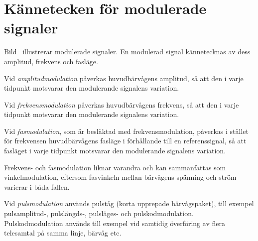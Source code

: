 \section{Kännetecken för modulerade signaler}
\label{kännetecken_modulerade_signaler}


Bild~ illustrerar modulerade signaler.
En modulerad signal kännetecknas av dess amplitud, frekvens och fasläge.

Vid \emph{amplitudmodulation} påverkas huvudbärvågens amplitud, så att den i
varje tidpunkt motsvarar den modulerande signalens variation.

Vid \emph{frekvensmodulation} påverkas huvudbärvågens frekvens, så att den i
varje tidpunkt motsvarar den modulerande signalens variation.

Vid \emph{fasmodulation}, som är besläktad med frekvensmodulation, påverkas i
stället för frekvensen huvudbärvågens fasläge i förhållande till en
referenssignal, så att fasläget i varje tidpunkt motsvarar den modulerande
signalens variation.

Frekvens- och fasmodulation liknar varandra och kan sammanfattas som
vinkelmodulation, eftersom fasvinkeln mellan bärvågens spänning och ström
varierar i båda fallen.

Vid \emph{pulsmodulation} används pulståg (korta upprepade bärvågspaket), till
exempel pulsamplitud-, pulslängds-, pulsläges- och pulskodmodulation.
Pulskodmodulation används till exempel vid samtidig överföring av flera
telesamtal på samma linje, bärvåg etc.
